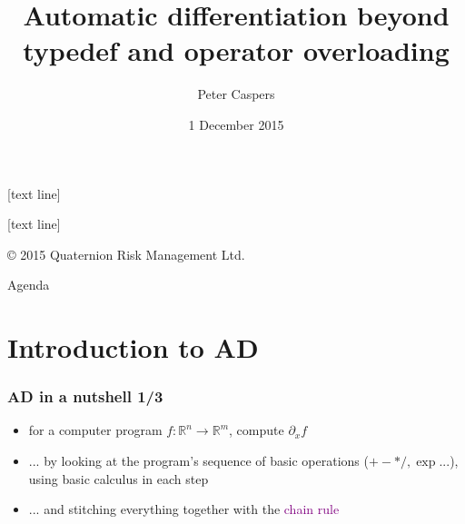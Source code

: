 \documentclass[10pt,German]{beamer}
\title{Automatic differentiation beyond typedef and operator overloading}
\author[QRM]{Peter Caspers}
\institute{\normalsize Quaternion Risk Management}
\date[Short Occasion]{\small 1 December 2015}
\begin{document}
[text line]{}
\begin{frame}
\vskip 3.5cm
{\bf
\titlepage
}
\end{frame}


[text line]{
\parbox{\linewidth}
{\color{white}
\selectfont
\vspace*{-6pt}\copyright{} 2015 Quaternion Risk Management Ltd. 
\hfill\insertauthor
\hfill\insertpagenumber}
}

\begin{frame}{Agenda}
\tableofcontents
\end{frame}


\section{Introduction to AD}

\begin{frame}[fragile]
\frametitle{AD in a nutshell 1/3}
\begin{itemize}
\item for a computer program $f:\mathbb{R}^n\rightarrow\mathbb{R}^m$, compute $\partial_{x} f$
\item $...$ by looking at the program's sequence of basic operations ($+-*/, \exp ...$), using basic calculus in each step
\item $...$ and stitching everything together with the \textcolor{purple}{chain rule}
\end{itemize}
\end{frame}
\end{document}
